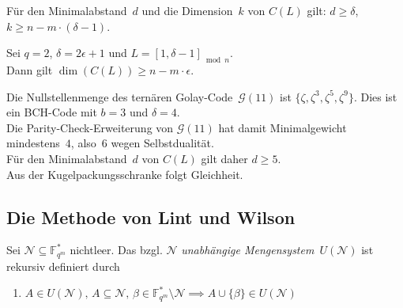 \documentclass{cheat-sheet}
\newcommand{\F}{\mathbb{F}} %
\newcommand{\Golay}{\mathcal{G}} %
\begin{document}
\begin{satz}
  Für den Minimalabstand~$d$ und die Dimension~$k$ von $C(L)$ gilt: \quad
  $d \geq \delta$, \enspace
  $k \geq n - m \cdot (\delta - 1)$.
\end{satz}

\begin{samepage}

\begin{satz}
  Sei $q = 2$, $\delta = 2 \epsilon + 1$ und $L = [1, \delta - 1]_{\bmod{n}}$. \\
  Dann gilt \enspace $\dim(C(L)) \geq n - m \cdot \epsilon$.
\end{satz}


\begin{bsp}
  Die Nullstellenmenge des ternären Golay-Code~$\Golay(11)$ ist $\{ \zeta, \zeta^3, \zeta^5, \zeta^9 \}$.
  Dies ist ein BCH-Code mit $b = 3$ und $\delta = 4$. \\
  Die Parity-Check-Erweiterung von $\Golay(11)$ hat damit Minimalgewicht mindestens~$4$, also~$6$ wegen Selbstdualität. \\
  Für den Minimalabstand~$d$ von $C(L)$ gilt daher $d \geq 5$. \\
  Aus der Kugelpackungsschranke folgt Gleichheit.
\end{bsp}




\subsection{Die Methode von Lint und Wilson}

\end{samepage}

\begin{defn}
  Sei $\mathcal{N} \subseteq \F_{q^m}^*$ nichtleer.
  Das bzgl. $\mathcal{N}$ \emph{unabhängige Mengensystem}~$U(\mathcal{N})$ ist rekursiv definiert durch
  \begin{enumerate}[label=\alph*), leftmargin=1.8em]
    \miniitem{0.6 \linewidth}{$A \in U(\mathcal{N}), \, \gamma \in \F_{q^m}^* \implies \gamma A \in U(\mathcal{N})$}
    \item $A \in U(\mathcal{N}), \, A \subseteq \mathcal{N}, \, \beta \in \F_{q^m}^* \setminus \mathcal{N} \implies A \cup \{ \beta \} \in U(\mathcal{N})$
  \end{enumerate}
\end{defn}
\end{document}
